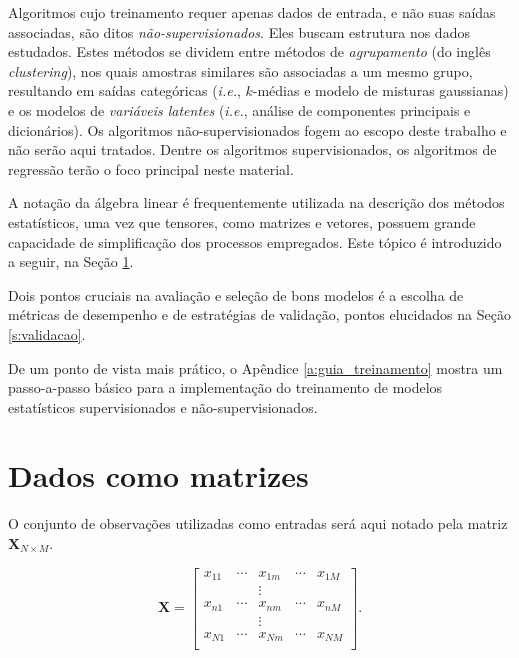   Algoritmos cujo treinamento requer apenas dados de entrada, e não suas saídas associadas, são ditos \emph{não-supervisionados}. Eles buscam estrutura nos dados estudados. Estes métodos se dividem entre métodos de \emph{agrupamento} (do inglês \textit{clustering}), nos quais amostras similares são associadas a um mesmo grupo, resultando em saídas categóricas (\textit{i.e.}, $k$-médias e modelo de misturas gaussianas) e os modelos de \emph{variáveis latentes} (\textit{i.e.}, análise de componentes principais e dicionários). Os algoritmos não-supervisionados fogem ao escopo deste trabalho e não serão aqui tratados. Dentre os algoritmos supervisionados, os algoritmos de regressão terão o foco principal neste material.

  A notação da álgebra linear é frequentemente utilizada na descrição dos métodos estatísticos, uma vez que tensores, como matrizes e vetores, possuem grande capacidade de simplificação dos processos empregados. Este tópico é introduzido a seguir, na Seção \ref{s:notacao_algebrica}.

  Dois pontos cruciais na avaliação e seleção de bons modelos é a escolha de métricas de desempenho e de estratégias de validação, pontos elucidados na Seção \ref{s:validacao}.

  De um ponto de vista mais prático, o Apêndice \ref{a:guia_treinamento} mostra um passo-a-passo básico para a implementação do treinamento de modelos estatísticos supervisionados e não-supervisionados.

  \section{Dados como matrizes}  \label{s:notacao_algebrica}

    O conjunto de observações utilizadas como entradas será aqui notado pela matriz $\boldsymbol{X}_{N \times M}$.

    \begin{equation} \label{e:X}
      \boldsymbol{X} = \begin{bmatrix}
        x_{11} & \cdots & x_{1m} & \cdots & x_{1M} \\
               & & \vdots & &       \\
        x_{n1} & \cdots & x_{nm} & \cdots & x_{nM} \\
               & & \vdots & &       \\
        x_{N1} & \cdots & x_{Nm} & \cdots & x_{NM} \\
      \end{bmatrix}
      .
    \end{equation}

